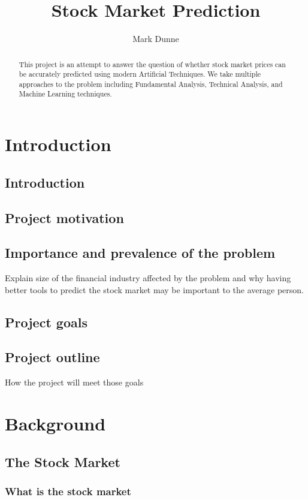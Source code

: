 \documentclass{report}
\title{Stock Market Prediction}
\author{Mark Dunne}
\begin{document}
\maketitle
\tableofcontents

\begin{abstract}

This project is an attempt to answer the question of whether stock market prices can be accurately predicted using modern Artificial Techniques. We take multiple approaches to the problem including Fundamental Analysis, Technical Analysis, and Machine Learning techniques.

\end{abstract}

\section{Introduction}
\subsection{Introduction}
\subsection{Project motivation}
\subsection{Importance and prevalence of the problem}
Explain size of the financial industry affected by the problem and why having better tools to predict the stock market may be important to the average person.
\subsection{Project goals}

\subsection{Project outline}
How the project will meet those goals

\section{Background}
\subsection{The Stock Market}
\subsubsection{What is the stock market}
\end{document}
